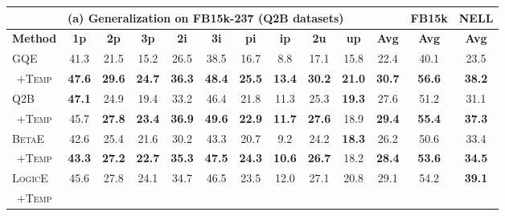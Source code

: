 \begin{table}[!htp]
\renewcommand\arraystretch{0.50}
\setlength{\tabcolsep}{0.95em}
\centering
\begin{tabular*}{\linewidth}{@{}ccccccccccccc@{}}
\toprule
\multicolumn{11}{c|}{(a) \textbf{Generalization on FB15k-237} (Q2B datasets)} & \textbf{FB15k} & \textbf{NELL}\\
\midrule
\multicolumn{1}{c|}{\textbf{Method}} & \textbf{1p} & \textbf{2p} & \textbf{3p} & \textbf{2i} & \multicolumn{1}{c|}{\textbf{3i}} & \textbf{pi} & \textbf{ip} & \textbf{2u} & \textbf{up} & \multicolumn{1}{c|}{\textbf{Avg}} & \textbf{Avg} & \textbf{Avg} \\
\midrule
\multicolumn{1}{l}{GQE}     
& 41.3      & 21.5      & 15.2      & 26.5      & 38.5      & 16.7      & 8.8      & 17.1   & 15.8      & 22.4      & 40.1      & 23.5 \\
\multicolumn{1}{c}{+\textsc{Temp}}     
& \textbf{47.6}      & \textbf{29.6}      & \textbf{24.7}      & \textbf{36.3}        & \textbf{48.4}      & \textbf{25.5}      & \textbf{13.4}        & \textbf{30.2}      & \textbf{21.0}      & \textbf{30.7}        & \textbf{56.6}      & \textbf{38.2} \\
\midrule
\multicolumn{1}{l}{Q2B}     
& \textbf{47.1}      & 24.9      & 19.4      & 33.2      & 46.4      & 21.8      & 11.3      & 25.3  & \textbf{19.3}      & 27.6      & 51.2      & 31.1 \\
\multicolumn{1}{c}{+\textsc{Temp}}     
& 45.7      & \textbf{27.8}      & \textbf{23.4}      & \textbf{36.9}     & \textbf{49.6}      & \textbf{22.9}      & \textbf{11.7}      & \textbf{27.6}  & 18.9      & \textbf{29.4}      & \textbf{55.4}      & \textbf{37.3} \\
\midrule
\multicolumn{1}{l}{\textsc{BetaE}}     
& 42.6      & 25.4      & 21.6      & 30.2      & 43.3      & 20.7      & 9.2      & 24.2  
& \textbf{18.3}      & 26.2      & 50.6      & 33.4 \\
\multicolumn{1}{c}{+\textsc{Temp}}     
& \textbf{43.3}      & \textbf{27.2}      & \textbf{22.7}      & \textbf{35.3} & \textbf{47.5}      & \textbf{24.3}      & \textbf{10.6}      & \textbf{26.7} & 18.2     & \textbf{28.4}      & \textbf{53.6}      & \textbf{34.5} \\
\midrule
\multicolumn{1}{l}{\textsc{LogicE}}     
& 45.6      & 27.8      & 24.1      & 34.7      & 46.5      & 23.5      & 12.0      & 27.1 
& 20.8      & 29.1      & 54.2      & \textbf{39.1} \\
\multicolumn{1}{c}{+\textsc{Temp}}     

\end{tabular*}
\end{table}
